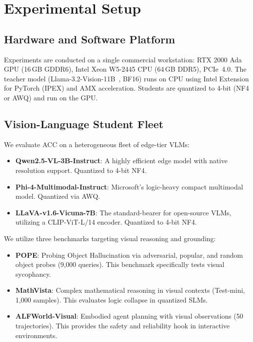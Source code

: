 \documentclass[runningheads]{article} %
\begin{document}
\section{Experimental Setup}
\enlargethispage{2\baselineskip}
\label{sec:setup}

\subsection{Hardware and Software Platform}
Experiments are conducted on a single commercial workstation: RTX 2000 Ada GPU (16\,GB GDDR6), Intel Xeon W5-2445 CPU (64\,GB DDR5), PCIe~4.0. The teacher model (Llama-3.2-Vision-11B~\cite{dubey2024llama32}, BF16) runs on CPU using Intel Extension for PyTorch (IPEX) and AMX acceleration. Students are quantized to 4-bit (NF4 or AWQ) and run on the GPU.

\subsection{Vision-Language Student Fleet}
We evaluate ACC on a heterogeneous fleet of edge-tier VLMs:
\begin{itemize}
  \item \textbf{Qwen2.5-VL-3B-Instruct}: A highly efficient edge model with native resolution support. Quantized to 4-bit NF4.
  \item \textbf{Phi-4-Multimodal-Instruct}: Microsoft's logic-heavy compact multimodal model. Quantized via AWQ.
  \item \textbf{LLaVA-v1.6-Vicuna-7B}: The standard-bearer for open-source VLMs, utilizing a CLIP-ViT-L/14 encoder. Quantized to 4-bit NF4.
\end{itemize}

We utilize three benchmarks targeting visual reasoning and grounding:
\begin{itemize}
  \item \textbf{POPE}: Probing Object Hallucination via adversarial, popular, and random object probes (9,000 queries). This benchmark specifically tests visual sycophancy.
  \item \textbf{MathVista}: Complex mathematical reasoning in visual contexts (Test-mini, 1,000 samples). This evaluates logic collapse in quantized SLMs.
  \item \textbf{ALFWorld-Visual}: Embodied agent planning with visual observations (50 trajectories). This provides the safety and reliability hook in interactive environments.
\end{itemize}
\end{document}
